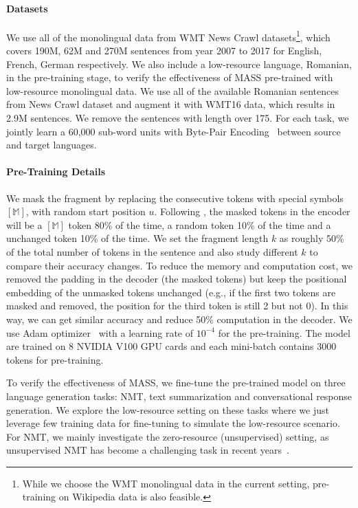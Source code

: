 \documentclass{article}
\begin{document}
	\paragraph{Datasets} We use all of the monolingual data from WMT News Crawl datasets\footnote{While we choose the WMT monolingual data in the current setting, pre-training on Wikipedia data is also feasible.}, which covers 190M, 62M and 270M sentences from year 2007 to 2017 for English, French, German respectively. We also include a low-resource language, Romanian, in the pre-training stage, to verify the effectiveness of MASS pre-trained with low-resource monolingual data. We use all of the available Romanian sentences from News Crawl dataset and augment it with WMT16 data, which results in 2.9M sentences. We remove the sentences with length over 175. For each task, we jointly learn a 60,000 sub-word units with Byte-Pair Encoding~\citep{sennrich2016neural} between source and target languages.
	
	\paragraph{Pre-Training Details} We mask the fragment by replacing the consecutive tokens with special symbols $[\mathbb{M}]$, with random start position $u$. Following \citet{devlin2018bert}, the masked tokens in the encoder will be a $[\mathbb{M}]$ token 80\% of the time, a random token 10\% of the time and a unchanged token 10\% of the time. We set the fragment length $k$ as roughly 50\% of the total number of tokens in the sentence and also study different $k$ to compare their accuracy changes. 
	To reduce the memory and computation cost, we removed the padding in the decoder (the masked tokens) but keep the positional embedding of the unmasked tokens unchanged (e.g., if the first two tokens are masked and removed, the position for the third token is still 2 but not 0). In this way, we can get similar accuracy and reduce 50\% computation in the decoder. We use Adam optimizer~\cite{kingma2015adam} with a learning rate of $10^{-4}$ for the pre-training. The model are trained on 8 NVIDIA V100 GPU cards and each mini-batch contains 3000 tokens for pre-training.


	To verify the effectiveness of MASS, we fine-tune the pre-trained model on three language generation tasks: NMT, text summarization and conversational response generation. We explore the low-resource setting on these tasks where we just leverage few training data for fine-tuning to simulate the low-resource scenario. For NMT, we mainly investigate the zero-resource (unsupervised) setting, as unsupervised NMT has become a challenging task in recent years~\citep{artetxe2017unsupervised,lample2017unsupervised,DBLP:conf/emnlp/LampleOCDR18}.
	
\end{document}
